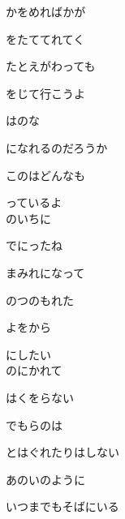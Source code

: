 {かをめればかが

をたててれてく

たとえがわっても

をじて行こうよ

はのな

になれるのだろうか

このはどんなも

っているよ
\\

のいちに

でにったね

まみれになって

のつのもれた

よをから

にしたい
\\

のにかれて

はくをらない

でもらのは

とはぐれたりはしない

あのいのように

いつまでもそばにいる

}